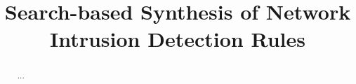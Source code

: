 \documentclass[conference]{IEEEtran}
\begin{document}
\title{Search-based Synthesis of Network Intrusion Detection Rules}



\maketitle

\begin{abstract}
...
\end{abstract}
\end{document}
